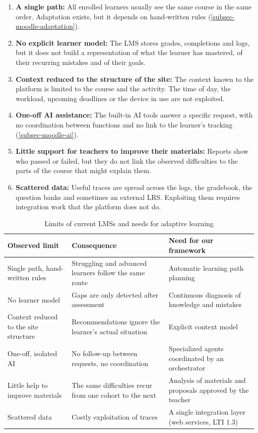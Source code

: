 \begin{enumerate}
  \item \textbf{A single path:} All enrolled learners usually see the same
        course in the same order. Adaptation exists, but it depends on
        hand-written rules (\cref{subsec-moodle-adaptation}).
  \item \textbf{No explicit learner model:} The LMS stores grades,
        completions and logs, but it does not build a representation of
        what the learner has mastered, of their recurring mistakes and of
        their goals.
  \item \textbf{Context reduced to the structure of the site:} The context
        known to the platform is limited to the course and the activity.
        The time of day, the workload, upcoming deadlines or the device in
        use are not exploited.
  \item \textbf{One-off AI assistance:} The built-in AI tools answer a
        specific request, with no coordination between functions and no
        link to the learner's tracking (\cref{subsec-moodle-ai}).
  \item \textbf{Little support for teachers to improve their materials:}
        Reports show who passed or failed, but they do not link the
        observed difficulties to the parts of the course that might
        explain them.
  \item \textbf{Scattered data:} Useful traces are spread across the logs,
        the gradebook, the question banks and sometimes an external LRS.
        Exploiting them requires integration work that the platform does
        not do.
\end{enumerate}

\begin{table}[htbp]
\centering
\caption{Limits of current LMSs and needs for adaptive learning}
\label{tab-limits}
\small
\begin{tabularx}{\textwidth}{@{}L{4.1cm}YY@{}}
\toprule
\textbf{Observed limit} & \textbf{Consequence} & \textbf{Need for our framework} \\
\midrule
Single path, hand-written rules & Struggling and advanced learners follow
  the same route & Automatic learning path planning \\
No learner model & Gaps are only detected after assessment & Continuous
  diagnosis of knowledge and mistakes \\
Context reduced to the site structure & Recommendations ignore the
  learner's actual situation & Explicit context model \\
One-off, isolated AI & No follow-up between requests, no coordination &
  Specialized agents coordinated by an orchestrator \\
Little help to improve materials & The same difficulties recur from one
  cohort to the next & Analysis of materials and proposals approved by the
  teacher \\
Scattered data & Costly exploitation of traces & A single integration
  layer (web services, LTI 1.3) \\
\bottomrule
\end{tabularx}
\end{table}

